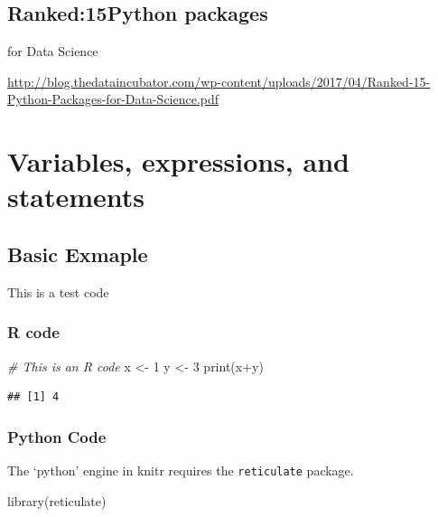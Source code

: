 \documentclass[
]{book}
\newenvironment{Shaded}{\begin{snugshade}}{\end{snugshade}}
\newcommand{\CommentTok}[1]{\textcolor[rgb]{0.56,0.35,0.01}{\textit{#1}}}
\newcommand{\DecValTok}[1]{\textcolor[rgb]{0.00,0.00,0.81}{#1}}
\newcommand{\FunctionTok}[1]{\textcolor[rgb]{0.00,0.00,0.00}{#1}}
\newcommand{\NormalTok}[1]{#1}
\newcommand{\OtherTok}[1]{\textcolor[rgb]{0.56,0.35,0.01}{#1}}
\newcommand{\SpecialCharTok}[1]{\textcolor[rgb]{0.00,0.00,0.00}{#1}}
\begin{document}
\hypertarget{ranked15python-packages}{%
\section{Ranked:15Python packages}\label{ranked15python-packages}}

for Data Science

\url{http://blog.thedataincubator.com/wp-content/uploads/2017/04/Ranked-15-Python-Packages-for-Data-Science.pdf}

\hypertarget{variables-expressions-and-statements}{%
\chapter{Variables, expressions, and statements}\label{variables-expressions-and-statements}}

\hypertarget{basic-exmaple}{%
\section{Basic Exmaple}\label{basic-exmaple}}

This is a test code

\hypertarget{r-code}{%
\subsection{R code}\label{r-code}}

\begin{Shaded}
\begin{Highlighting}[]
\CommentTok{\# This is an R code}
\NormalTok{x }\OtherTok{\textless{}{-}} \DecValTok{1}
\NormalTok{y }\OtherTok{\textless{}{-}} \DecValTok{3}
\FunctionTok{print}\NormalTok{(x}\SpecialCharTok{+}\NormalTok{y)}
\end{Highlighting}
\end{Shaded}

\begin{verbatim}
## [1] 4
\end{verbatim}

\hypertarget{python-code}{%
\subsection{Python Code}\label{python-code}}

The `python' engine in knitr requires the \texttt{reticulate} package.

\begin{Shaded}
\begin{Highlighting}[]
\FunctionTok{library}\NormalTok{(reticulate)}
\end{Highlighting}
\end{Shaded}
\end{document}
